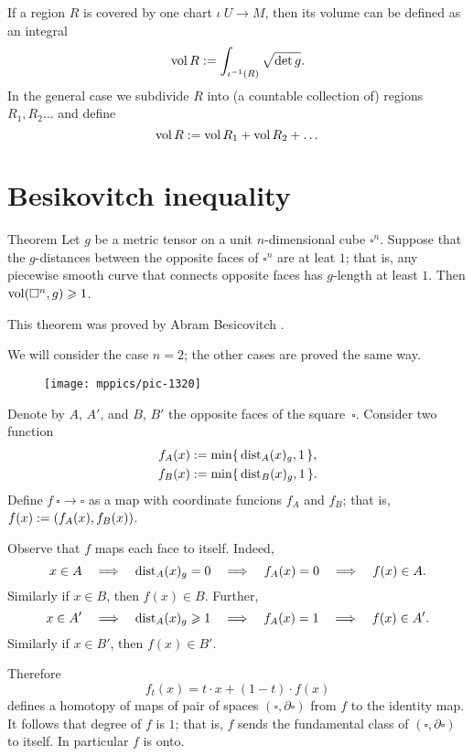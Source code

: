 If a region $R$ is covered by one chart $\iota\:U\to M$,
then its volume can be defined as an integral 
\[\operatorname{\rm vol}\nolimits R
\mathrel{:=}
\int_{\iota^{-1}(R)}\sqrt{\det{g}}.\]
In the general case we subdivide $R$ into (a countable collection of) regions $R_1,R_2\dots$ and define
\[\operatorname{\rm vol}\nolimits R\mathrel{:=} \operatorname{\rm vol}\nolimits R_1+\operatorname{\rm vol}\nolimits R_2+\dots\]

\section{Besikovitch inequality}

\begin{thm}{Theorem}\label{thm:besikovitch}
Let $g$ be a metric tensor on a unit $n$-dimensional cube $\square^n$.
Suppose that the $g$-distances between the opposite faces of $\square^n$ are at leat $1$; that is, any piecewise smooth curve that connects opposite faces has $g$-length at least $1$.
Then $\operatorname{\rm vol}\nolimits(\square^n, g)\geqslant 1$.
\end{thm}

This theorem was proved by Abram Besicovitch \cite{besicovitch}.

We will consider the case $n=2$; the other cases are proved the same way.

\begin{wrapfigure}{r}{30mm}
\vskip-0mm
\centering
\texttt{[image: mppics/pic-1320]}
\end{wrapfigure}

Denote by $A$, $A'$, and $B$, $B'$ the opposite faces of the square~$\square$.
Consider two function 
\begin{align*}
f_A(x)&\mathrel{:=}\min\{\,\mathrm{dist}_A(x)_g,1\,\},
\\
f_B(x)&\mathrel{:=}\min\{\,\mathrm{dist}_B(x)_g,1\,\}.
\end{align*}
Define $f\:\square\to\square$ as a map with coordinate funcions $f_A$ and $f_B$;
that is, $f(x)\mathrel{:=}(f_A(x), f_B(x))$.

Observe that $f$ maps each face to itself.
Indeed, 
\[x\in A \quad\Longrightarrow\quad \mathrm{dist}_A(x)_g=0 \quad\Longrightarrow\quad f_A(x)=0 \quad\Longrightarrow\quad f(x)\in A.\]
Similarly if $x\in B$, then $f(x)\in B$.
Further, 
\[x\in A'
\quad\Longrightarrow\quad 
\mathrm{dist}_A(x)_g\geqslant 1 
\quad\Longrightarrow\quad 
f_A(x)=1 
\quad\Longrightarrow\quad 
f(x)\in A'.\]
Similarly if $x\in B'$, then $f(x)\in B'$.

Therefore 
\[f_t(x)= t\cdot x + (1-t)\cdot f(x)\]
defines a homotopy of maps of pair of spaces $(\square,\partial \square)$ from $f$ to the identity map.
It follows that degree of $f$ is $1$; that is, $f$ sends the fundamental class of $(\square,\partial \square)$ to itself.
In particular $f$ is onto.

